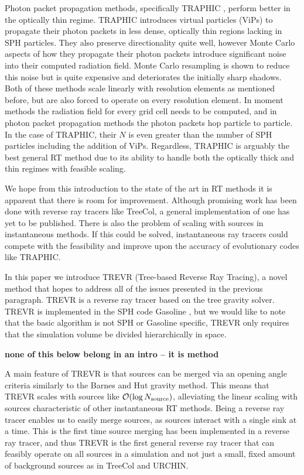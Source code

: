 \documentclass[fleqn,usenatbib]{mnras}
\newcommand{\acro}{TREVR}
\begin{document}
Photon packet propagation methods, specifically TRAPHIC \citep{pawlikSchaye08},
 perform better in the optically thin regime. TRAPHIC introduces virtual 
particles (ViPs) to propagate their photon packets in less dense, optically 
thin regions lacking in SPH particles. They also preserve directionality quite 
well, however Monte Carlo aspects of how they propagate their photon packets 
introduce significant noise into their computed radiation field. Monte Carlo
 resampling is shown to reduce this noise but is quite expensive and 
deteriorates the initially sharp shadows. Both of these methods scale linearly 
with resolution elements as mentioned before, but are also forced to operate on
 every resolution element. In moment methods the radiation field for every 
grid cell needs to be computed, and in photon packet propagation methods the 
photon packets hop particle to particle. In the case of TRAPHIC, their $N$ is 
even greater than the number of SPH particles including the addition of ViPs. 
Regardless, TRAPHIC is arguably the best general RT method due to its ability 
to handle both the optically thick and thin regimes with feasible scaling.

We hope from this introduction to the state of the art in RT methods it is 
apparent that there is room for improvement. Although promising work has been 
done with reverse ray tracers like TreeCol, a general implementation of one has
 yet to be published. There is also the problem of scaling with sources in 
instantaneous methods. If this could be solved, instantaneous ray tracers could
 compete with the feasibility and improve upon the accuracy of evolutionary
 codes like TRAPHIC.

In this paper we introduce \acro{} (Tree-based Reverse Ray Tracing), a novel 
method that hopes to address all of the issues presented in the previous 
paragraph. \acro{} is a reverse ray tracer based on the \cite{barnesHut86} tree
 gravity solver. \acro{} is implemented in the SPH code Gasoline 
\citep{wadsleyEt03}, but we would like to note that the basic algorithm is not
 SPH or Gasoline specific, \acro{} only requires that the simulation volume be 
divided hierarchically in space. 

{\bf none of this below belong in an intro -- it is method }

A main feature of \acro{} is that sources can be merged via an opening  angle 
criteria similarly to the Barnes and Hut gravity method. This means that 
\acro{} scales with sources like $\mathcal{O}(\log N_{\rm source})$, 
alleviating the linear scaling with sources characteristic of other 
instantaneous RT methods. Being a reverse ray tracer enables us to easily merge
 sources, as sources interact with a single sink at a time. This is 
the first time source merging has been implemented in a reverse ray tracer, and
 thus \acro{} is the first general reverse ray tracer that can feasibly operate
 on all sources in a simulation and not just a small, fixed amount of 
background sources as in TreeCol and URCHIN.
\end{document}
